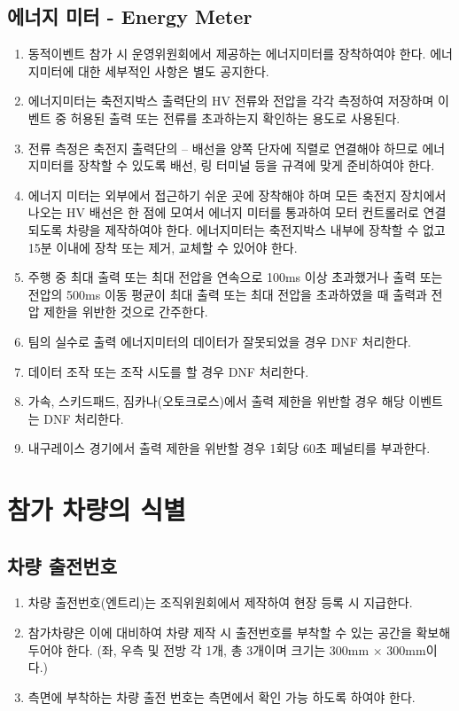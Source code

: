 \documentclass[final,a4paper,10pt]{report}
\begin{document}
\section{에너지 미터 - Energy Meter}
\begin{enumerate}
  \item 동적이벤트 참가 시 운영위원회에서 제공하는 에너지미터를 장착하여야 한다. 에너지미터에 대한 세부적인 사항은 별도 공지한다.
  \item 에너지미터는 축전지박스 출력단의 HV 전류와 전압을 각각 측정하여 저장하며 이벤트 중 허용된 출력 또는 전류를 초과하는지 확인하는 용도로 사용된다.
  \item 전류 측정은 축전지 출력단의 – 배선을 양쪽 단자에 직렬로 연결해야 하므로 에너지미터를 장착할 수 있도록 배선, 링 터미널 등을 규격에 맞게 준비하여야 한다.
  \item 에너지 미터는 외부에서 접근하기 쉬운 곳에 장착해야 하며 모든 축전지 장치에서 나오는 HV 배선은 한 점에 모여서 에너지 미터를 통과하여 모터 컨트롤러로 연결되도록 차량을 제작하여야 한다. 에너지미터는 축전지박스 내부에 장착할 수 없고 15분 이내에 장착 또는 제거, 교체할 수 있어야 한다.
  \item 주행 중 최대 출력 또는 최대 전압을 연속으로 100ms 이상 초과했거나 출력 또는 전압의 500ms 이동 평균이 최대 출력 또는 최대 전압을 초과하였을 때 출력과 전압 제한을 위반한 것으로 간주한다.
  \item 팀의 실수로 출력 에너지미터의 데이터가 잘못되었을 경우 DNF 처리한다.
  \item 데이터 조작 또는 조작 시도를 할 경우 DNF 처리한다.
  \item 가속, 스키드패드, 짐카나(오토크로스)에서 출력 제한을 위반할 경우 해당 이벤트는 DNF 처리한다.
  \item 내구레이스 경기에서 출력 제한을 위반할 경우 1회당 60초 페널티를 부과한다.
  
\end{enumerate}

\chapter{참가 차량의 식별}

\section{차량 출전번호} \label{section:차량 출전번호}
\begin{enumerate}
  \item 차량 출전번호(엔트리)는 조직위원회에서 제작하여 현장 등록 시 지급한다.
  \item 참가차량은 이에 대비하여 차량 제작 시 출전번호를 부착할 수 있는 공간을 확보해 두어야 한다. (좌, 우측 및 전방 각 1개, 총 3개이며 크기는 300mm × 300mm이다.)
  \item 측면에 부착하는 차량 출전 번호는 측면에서 확인 가능 하도록 하여야 한다.
\end{enumerate}
\end{document}
